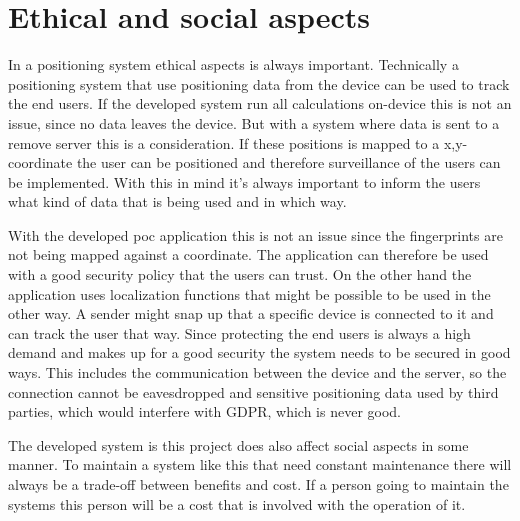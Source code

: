 



\section{Ethical and social aspects}\label{sec:discussionAspects}
In a positioning system ethical aspects is always important.
Technically a positioning system that use positioning data from the device can be used to track the end users.
If the developed system run all calculations on-device this is not an issue, since no data leaves the device.
But with a system where data is sent to a remove server this is a consideration.
If these positions is mapped to a x,y-coordinate the user can be positioned and therefore surveillance of the users can be implemented.
With this in mind it's always important to inform the users what kind of data that is being used and in which way.

\bigskip

With the developed \acrshort{poc} application this is not an issue since the fingerprints are not being mapped against a coordinate.
The application can therefore be used with a good security policy that the users can trust.
On the other hand the application uses localization functions that might be possible to be used in the other way.
A sender might snap up that a specific device is connected to it and can track the user that way.
Since protecting the end users is always a high demand and makes up for a good security the system needs to be secured in good ways.
This includes the communication between the device and the server, so the connection cannot be eavesdropped and sensitive positioning data used by third parties, which would interfere with GDPR, which is never good.

\bigskip

The developed system is this project does also affect social aspects in some manner.
To maintain a system like this that need constant maintenance there will always be a trade-off between benefits and cost.
If a person going to maintain the systems this person will be a cost that is involved with the operation of it.


